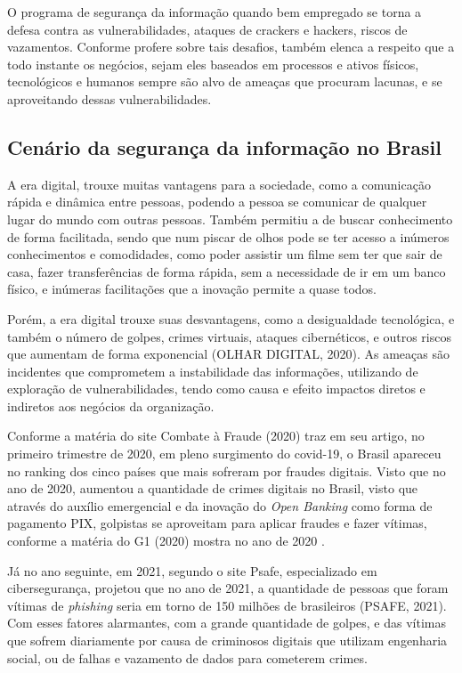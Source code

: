 \documentclass[
	12pt,				%
	openright,			%
	oneside,			%
	a4paper,			%
	english,			%
	french,				%
	spanish,			%
	brazil,				%
	]{abntex2}
\begin{document}
O programa de segurança da informação quando bem empregado se torna a defesa contra as vulnerabilidades, ataques de crackers e hackers, riscos de vazamentos. Conforme profere  sobre tais desafios, também elenca a respeito que a todo instante os negócios, sejam eles baseados em processos e ativos físicos, tecnológicos e humanos sempre são alvo de ameaças que procuram lacunas, e se aproveitando dessas vulnerabilidades.

\subsection{Cenário da segurança da informação no Brasil}

A era digital, trouxe muitas vantagens para a sociedade, como a comunicação rápida e dinâmica entre pessoas, podendo a pessoa se comunicar de qualquer lugar do mundo com outras pessoas. Também permitiu a de buscar conhecimento de forma facilitada, sendo que num piscar de olhos pode se ter acesso a inúmeros conhecimentos e comodidades, como poder assistir um filme sem ter que sair de casa, fazer transferências de forma rápida, sem a necessidade de ir em um banco físico, e inúmeras facilitações que a inovação permite a quase todos.

Porém, a era digital trouxe suas desvantagens, como a desigualdade tecnológica, e também o número de golpes, crimes virtuais, ataques cibernéticos, e outros riscos que aumentam de forma exponencial (OLHAR DIGITAL, 2020). As ameaças são incidentes que comprometem a instabilidade das informações, utilizando de exploração de vulnerabilidades, tendo como causa e efeito impactos diretos e indiretos aos negócios da organização.

Conforme a matéria do site Combate à Fraude (2020) traz em seu artigo, no primeiro trimestre de 2020, em pleno surgimento do covid-19, o Brasil apareceu no ranking dos cinco países que mais sofreram por fraudes digitais. Visto que no ano de 2020, aumentou a quantidade de crimes digitais no Brasil, visto que através do auxílio emergencial e da inovação do \textit{Open Banking} como forma de pagamento PIX, golpistas se aproveitam para aplicar fraudes e fazer vítimas, conforme a matéria do G1 (2020) mostra no ano de 2020 .

Já no ano seguinte, em 2021, segundo o site Psafe, especializado em cibersegurança, projetou que no ano de 2021, a quantidade de pessoas que foram vítimas de \textit{phishing} seria em torno de 150 milhões de brasileiros (PSAFE, 2021). Com esses fatores alarmantes, com a grande quantidade de golpes, e das vítimas que sofrem diariamente por causa de criminosos digitais que utilizam engenharia social, ou de falhas e vazamento de dados para cometerem crimes. 
\end{document}
